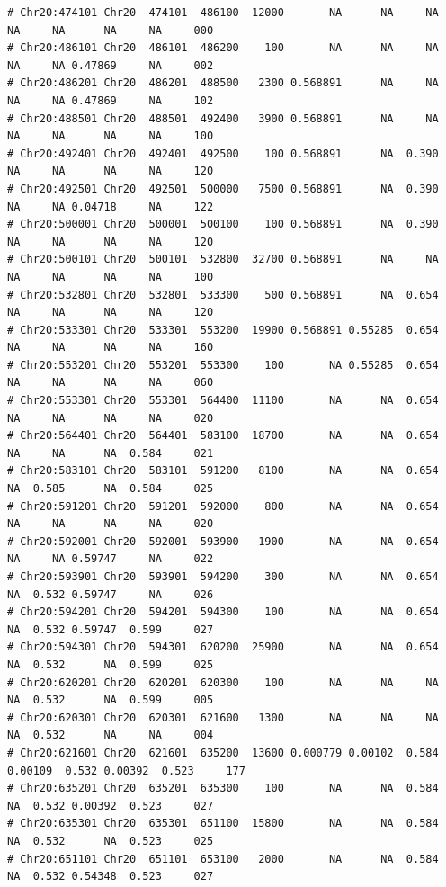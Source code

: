 \documentclass{article}\usepackage[]{graphicx}\usepackage[]{color}
\makeatletter
\newenvironment{kframe}{%
 \def\at@end@of@kframe{}%
 \ifinner\ifhmode%
  \def\at@end@of@kframe{\end{minipage}}%
  \begin{minipage}{\columnwidth}%
 \fi\fi%
 \def\FrameCommand##1{\hskip\@totalleftmargin \hskip-\fboxsep
 \colorbox{shadecolor}{##1}\hskip-\fboxsep
     \hskip-\linewidth \hskip-\@totalleftmargin \hskip\columnwidth}%
 \MakeFramed {\advance\hsize-\width
   \@totalleftmargin\z@ \linewidth\hsize
   \@setminipage}}%
 {\par\unskip\endMakeFramed%
 \at@end@of@kframe}
\newenvironment{knitrout}{}{} %
\makeatother
\begin{document}
\begin{knitrout}
\begin{kframe}
\begin{verbatim}
# Chr20:474101 Chr20  474101  486100  12000       NA      NA     NA      NA     NA      NA     NA     000
# Chr20:486101 Chr20  486101  486200    100       NA      NA     NA      NA     NA 0.47869     NA     002
# Chr20:486201 Chr20  486201  488500   2300 0.568891      NA     NA      NA     NA 0.47869     NA     102
# Chr20:488501 Chr20  488501  492400   3900 0.568891      NA     NA      NA     NA      NA     NA     100
# Chr20:492401 Chr20  492401  492500    100 0.568891      NA  0.390      NA     NA      NA     NA     120
# Chr20:492501 Chr20  492501  500000   7500 0.568891      NA  0.390      NA     NA 0.04718     NA     122
# Chr20:500001 Chr20  500001  500100    100 0.568891      NA  0.390      NA     NA      NA     NA     120
# Chr20:500101 Chr20  500101  532800  32700 0.568891      NA     NA      NA     NA      NA     NA     100
# Chr20:532801 Chr20  532801  533300    500 0.568891      NA  0.654      NA     NA      NA     NA     120
# Chr20:533301 Chr20  533301  553200  19900 0.568891 0.55285  0.654      NA     NA      NA     NA     160
# Chr20:553201 Chr20  553201  553300    100       NA 0.55285  0.654      NA     NA      NA     NA     060
# Chr20:553301 Chr20  553301  564400  11100       NA      NA  0.654      NA     NA      NA     NA     020
# Chr20:564401 Chr20  564401  583100  18700       NA      NA  0.654      NA     NA      NA  0.584     021
# Chr20:583101 Chr20  583101  591200   8100       NA      NA  0.654      NA  0.585      NA  0.584     025
# Chr20:591201 Chr20  591201  592000    800       NA      NA  0.654      NA     NA      NA     NA     020
# Chr20:592001 Chr20  592001  593900   1900       NA      NA  0.654      NA     NA 0.59747     NA     022
# Chr20:593901 Chr20  593901  594200    300       NA      NA  0.654      NA  0.532 0.59747     NA     026
# Chr20:594201 Chr20  594201  594300    100       NA      NA  0.654      NA  0.532 0.59747  0.599     027
# Chr20:594301 Chr20  594301  620200  25900       NA      NA  0.654      NA  0.532      NA  0.599     025
# Chr20:620201 Chr20  620201  620300    100       NA      NA     NA      NA  0.532      NA  0.599     005
# Chr20:620301 Chr20  620301  621600   1300       NA      NA     NA      NA  0.532      NA     NA     004
# Chr20:621601 Chr20  621601  635200  13600 0.000779 0.00102  0.584 0.00109  0.532 0.00392  0.523     177
# Chr20:635201 Chr20  635201  635300    100       NA      NA  0.584      NA  0.532 0.00392  0.523     027
# Chr20:635301 Chr20  635301  651100  15800       NA      NA  0.584      NA  0.532      NA  0.523     025
# Chr20:651101 Chr20  651101  653100   2000       NA      NA  0.584      NA  0.532 0.54348  0.523     027

\end{verbatim}
\end{kframe}
\end{knitrout}
\end{document}
